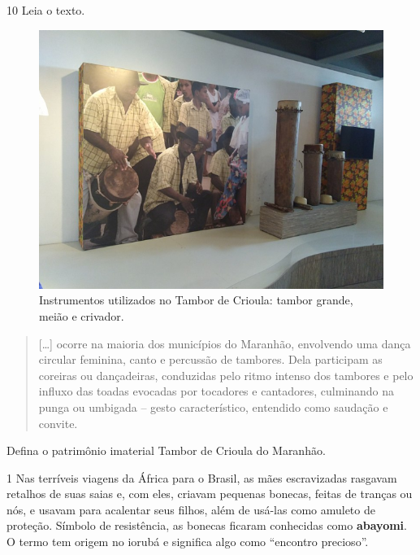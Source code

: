 \num{10} Leia o texto.

\begin{figure}[htpb!]
\includegraphics[width=\textwidth]{./imgs/art29.png}
\caption{Instrumentos utilizados no Tambor de Crioula: tambor grande, meião e crivador.}
\end{figure}

\begin{quote}
{[}\ldots{}{]} ocorre na maioria dos municípios do
Maranhão, envolvendo uma dança circular feminina, canto e percussão de
tambores. Dela participam as coreiras ou dançadeiras, conduzidas pelo
ritmo intenso dos tambores e pelo influxo das toadas evocadas por
tocadores e cantadores, culminando na punga ou umbigada – gesto
característico, entendido como saudação e convite.

\end{quote}

Defina o patrimônio imaterial Tambor de Crioula do Maranhão.




\num{1}  Nas terríveis viagens da África para o Brasil, as mães escravizadas
rasgavam retalhos de suas saias e, com eles, criavam pequenas bonecas, feitas
de tranças ou nós, e usavam para acalentar seus filhos, além de usá-las como
amuleto de proteção. Símbolo de resistência, as bonecas ficaram conhecidas
como \textbf{abayomi}. O termo tem origem no iorubá e significa algo como
“encontro precioso”.

